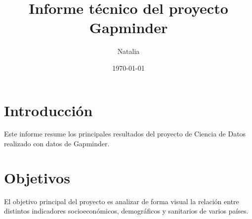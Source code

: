 \documentclass{article}
\title{Informe técnico del proyecto Gapminder}
\author{Natalia}
\date{\today}
\begin{document}


\maketitle

\section{Introducción}

Este informe resume los principales resultados del proyecto de Ciencia de Datos realizado con datos de Gapminder.

\section{Objetivos}

El objetivo principal del proyecto es analizar de forma visual la relación entre distintos indicadores socioeconómicos, demográficos y sanitarios de varios países.
\end{document}
